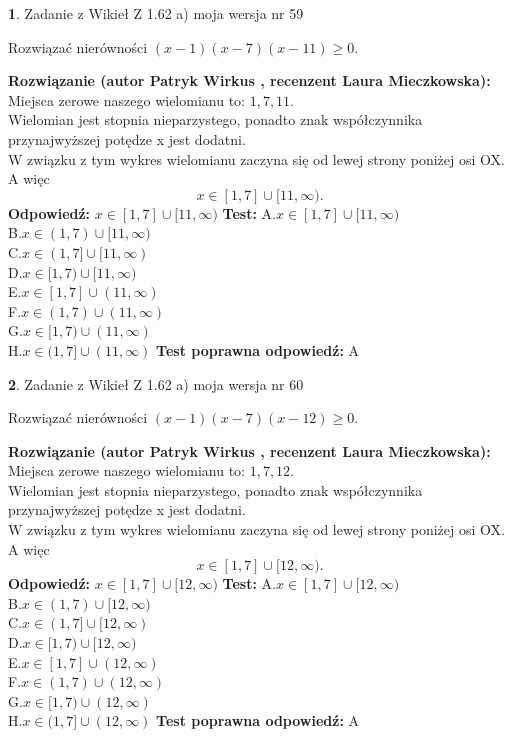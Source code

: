 \documentclass[12pt, a4paper]{article}
\theoremstyle{definition} %
\newtheorem{zad}{}
\newcommand{\zadStart}[1]{\begin{zad}#1\newline}
\newcommand{\zadStop}{\end{zad}}
\newcommand{\rozwStart}[2]{\noindent \textbf{Rozwiązanie (autor #1 , recenzent #2): }\newline}
\newcommand{\rozwStop}{\newline}
\newcommand{\odpStart}{\noindent \textbf{Odpowiedź:}\newline}
\newcommand{\odpStop}{\newline}
\newcommand{\testStart}{\noindent \textbf{Test:}\newline}
\newcommand{\testStop}{\newline}
\newcommand{\kluczStart}{\noindent \textbf{Test poprawna odpowiedź:}\newline}
\newcommand{\kluczStop}{\newline}
\begin{document}
\zadStart{Zadanie z Wikieł Z 1.62 a) moja wersja nr 59}

Rozwiązać nierówności $(x-1)(x-7)(x-11)\ge0$.
\zadStop
\rozwStart{Patryk Wirkus}{Laura Mieczkowska}
Miejsca zerowe naszego wielomianu to: $1, 7, 11$.\\
Wielomian jest stopnia nieparzystego, ponadto znak współczynnika przy\linebreak najwyższej potędze x jest dodatni.\\ W związku z tym wykres wielomianu zaczyna się od lewej strony poniżej osi OX. A więc $$x \in [1,7] \cup [11,\infty).$$
\rozwStop
\odpStart
$x \in [1,7] \cup [11,\infty)$
\odpStop
\testStart
A.$x \in [1,7] \cup [11,\infty)$\\
B.$x \in (1,7) \cup [11,\infty)$\\
C.$x \in (1,7] \cup [11,\infty)$\\
D.$x \in [1,7) \cup [11,\infty)$\\
E.$x \in [1,7] \cup (11,\infty)$\\
F.$x \in (1,7) \cup (11,\infty)$\\
G.$x \in [1,7) \cup (11,\infty)$\\
H.$x \in (1,7] \cup (11,\infty)$
\testStop
\kluczStart
A
\kluczStop



\zadStart{Zadanie z Wikieł Z 1.62 a) moja wersja nr 60}

Rozwiązać nierówności $(x-1)(x-7)(x-12)\ge0$.
\zadStop
\rozwStart{Patryk Wirkus}{Laura Mieczkowska}
Miejsca zerowe naszego wielomianu to: $1, 7, 12$.\\
Wielomian jest stopnia nieparzystego, ponadto znak współczynnika przy\linebreak najwyższej potędze x jest dodatni.\\ W związku z tym wykres wielomianu zaczyna się od lewej strony poniżej osi OX. A więc $$x \in [1,7] \cup [12,\infty).$$
\rozwStop
\odpStart
$x \in [1,7] \cup [12,\infty)$
\odpStop
\testStart
A.$x \in [1,7] \cup [12,\infty)$\\
B.$x \in (1,7) \cup [12,\infty)$\\
C.$x \in (1,7] \cup [12,\infty)$\\
D.$x \in [1,7) \cup [12,\infty)$\\
E.$x \in [1,7] \cup (12,\infty)$\\
F.$x \in (1,7) \cup (12,\infty)$\\
G.$x \in [1,7) \cup (12,\infty)$\\
H.$x \in (1,7] \cup (12,\infty)$
\testStop
\kluczStart
A
\kluczStop
\end{document}

